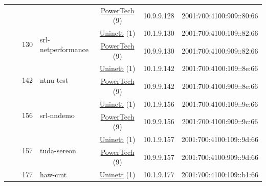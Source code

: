 \begin{small}
\begin{center}
\begin{longtable}{|c|c|c|c|c|c|c|c|}
  &  &  &  & \multicolumn{2}{|c|}{\tiny{\href{http://www.powertech.no}{PowerTech} (9)}} & \tiny{10.9.9.128} & \tiny{2001:700:4100:909::80:66} \\* \cline{3-3}\cline{4-4}\cline{5-5}\cline{6-6}\cline{7-7}\cline{8-8}
  &  & \multirow{2}{*}{\tiny{130}} & \multicolumn{1}{|l|}{\multirow{2}{*}{\tiny{srl-netperformance}}} & \multicolumn{2}{|c|}{\tiny{\href{https://www.uninett.no}{Uninett} (1)}} & \tiny{10.1.9.130} & \tiny{2001:700:4100:109::82:66} \\* \cline{5-5}\cline{6-6}\cline{7-7}\cline{8-8}
  &  &  &  & \multicolumn{2}{|c|}{\tiny{\href{http://www.powertech.no}{PowerTech} (9)}} & \tiny{10.9.9.130} & \tiny{2001:700:4100:909::82:66} \\* \cline{3-3}\cline{4-4}\cline{5-5}\cline{6-6}\cline{7-7}\cline{8-8}
  &  & \multirow{2}{*}{\tiny{142}} & \multicolumn{1}{|l|}{\multirow{2}{*}{\tiny{ntnu-test}}} & \multicolumn{2}{|c|}{\tiny{\href{https://www.uninett.no}{Uninett} (1)}} & \tiny{10.1.9.142} & \tiny{2001:700:4100:109::8e:66} \\* \cline{5-5}\cline{6-6}\cline{7-7}\cline{8-8}
  &  &  &  & \multicolumn{2}{|c|}{\tiny{\href{http://www.powertech.no}{PowerTech} (9)}} & \tiny{10.9.9.142} & \tiny{2001:700:4100:909::8e:66} \\* \cline{3-3}\cline{4-4}\cline{5-5}\cline{6-6}\cline{7-7}\cline{8-8}
  &  & \multirow{2}{*}{\tiny{156}} & \multicolumn{1}{|l|}{\multirow{2}{*}{\tiny{srl-nndemo}}} & \multicolumn{2}{|c|}{\tiny{\href{https://www.uninett.no}{Uninett} (1)}} & \tiny{10.1.9.156} & \tiny{2001:700:4100:109::9c:66} \\* \cline{5-5}\cline{6-6}\cline{7-7}\cline{8-8}
  &  &  &  & \multicolumn{2}{|c|}{\tiny{\href{http://www.powertech.no}{PowerTech} (9)}} & \tiny{10.9.9.156} & \tiny{2001:700:4100:909::9c:66} \\* \cline{3-3}\cline{4-4}\cline{5-5}\cline{6-6}\cline{7-7}\cline{8-8}
  &  & \multirow{2}{*}{\tiny{157}} & \multicolumn{1}{|l|}{\multirow{2}{*}{\tiny{tuda-sereon}}} & \multicolumn{2}{|c|}{\tiny{\href{https://www.uninett.no}{Uninett} (1)}} & \tiny{10.1.9.157} & \tiny{2001:700:4100:109::9d:66} \\* \cline{5-5}\cline{6-6}\cline{7-7}\cline{8-8}
  &  &  &  & \multicolumn{2}{|c|}{\tiny{\href{http://www.powertech.no}{PowerTech} (9)}} & \tiny{10.9.9.157} & \tiny{2001:700:4100:909::9d:66} \\* \cline{3-3}\cline{4-4}\cline{5-5}\cline{6-6}\cline{7-7}\cline{8-8}
  &  & \multirow{2}{*}{\tiny{177}} & \multicolumn{1}{|l|}{\multirow{2}{*}{\tiny{haw-cmt}}} & \multicolumn{2}{|c|}{\tiny{\href{https://www.uninett.no}{Uninett} (1)}} & \tiny{10.1.9.177} & \tiny{2001:700:4100:109::b1:66} \\* \cline{5-5}\cline{6-6}\cline{7-7}\cline{8-8}

\end{longtable}
\end{center}
\end{small}

